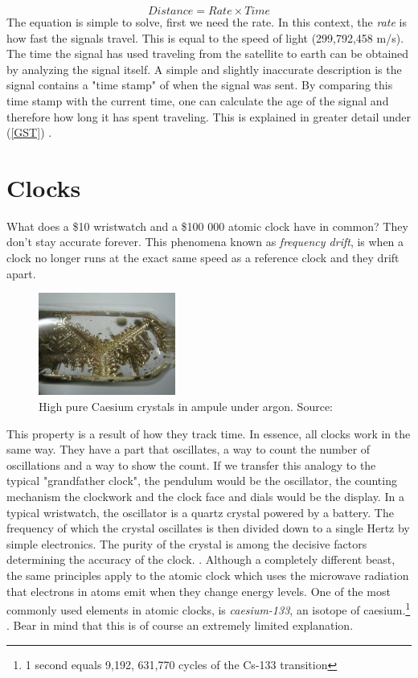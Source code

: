 \documentclass[12pt,english,a4paper]{article}
\begin{document}
\begin{equation} Distance = Rate \times Time \end{equation} 
The equation is simple to solve, first we need the rate. In this context, the \textit{rate} is how fast the signals travel. This is equal to the speed of light (299,792,458 m/s). The time the signal has used traveling from the satellite to earth can be obtained by analyzing the signal itself. A simple and slightly inaccurate description is the signal contains a "time stamp" of when the signal was sent. By comparing this time stamp with the current time, one can calculate the age of the signal and therefore how long it has spent traveling. This is explained in greater detail under (\ref{GST}) \cite{GPSGOVTE}.  

\section{Clocks}
What does a \$10 wristwatch and a \$100 000 atomic clock have in common? They don't stay accurate forever. This phenomena known as \textit{frequency drift}, is when a clock no longer runs at the exact same speed as a reference clock and they drift apart.
\begin{figure}
  \centering
  \includegraphics[width=0.40\textwidth]{cscrystals.jpg}
  \caption[Caesium campule]
   {High pure Caesium crystals in ampule under argon. Source: \cite{DENCES}}
\end{figure} 
This property is a result of how they track time. In essence, all clocks work in the same way. They have a part that oscillates, a way to count the number of oscillations and a way to show the count. If we transfer this analogy to the typical "grandfather clock", the pendulum would be the oscillator, the counting mechanism the clockwork and the clock face and dials would be the display. In a typical wristwatch, the oscillator is a quartz crystal powered by a battery. The frequency of which the crystal oscillates is then divided down to a single Hertz by simple electronics. The purity of the crystal is among the decisive factors determining the accuracy of the clock. \cite{CSMG}. 
Although a completely different beast, the same principles apply to the atomic clock which uses the microwave radiation that electrons in atoms emit when they change energy levels. One of the most commonly used elements in atomic clocks, is \textit{caesium-133}, an isotope of caesium.\footnote{1 second equals 9,192, 631,770 cycles of the Cs-133 transition} \cite{HP}. Bear in mind that this is of course an extremely limited explanation.
\end{document}
